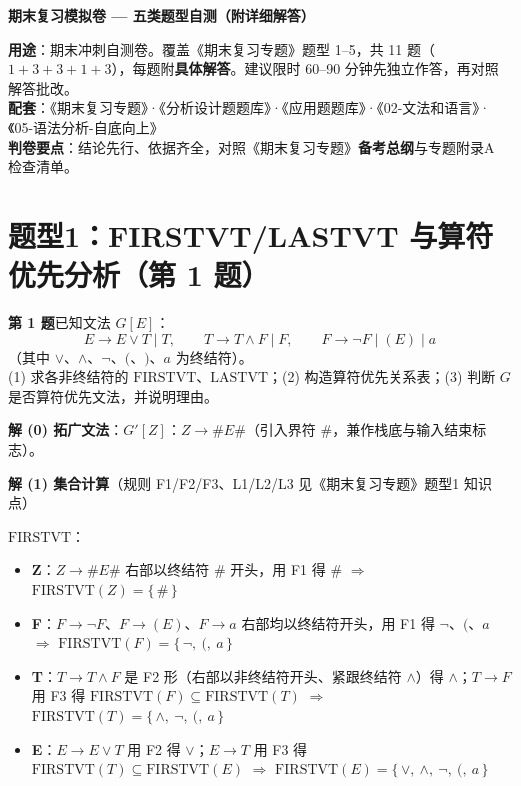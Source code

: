 \documentclass[12pt,a4paper,fontset=windows]{ctexart}
\newcommand{\FV}[1]{\ensuremath{\mathrm{FIRSTVT}(#1)}}
\newcommand{\FVname}{\ensuremath{\mathrm{FIRSTVT}}}
\newcommand{\LVname}{\ensuremath{\mathrm{LASTVT}}}
\newcommand{\imp}{\ensuremath{\Rightarrow}}
\begin{document}
\begin{center}
{\LARGE\bfseries 期末复习模拟卷 — 五类题型自测（附详细解答）}
\end{center}

\begin{infobox}
\textbf{用途}：期末冲刺自测卷。覆盖《期末复习专题》题型 1--5，共 11 题（$1+3+3+1+3$），每题附\textbf{具体解答}。建议限时 60--90 分钟先独立作答，再对照解答批改。\\
\textbf{配套}：《期末复习专题》·《分析设计题题库》·《应用题题库》·《02-文法和语言》·《05-语法分析-自底向上》\\
\textbf{判卷要点}：结论先行、依据齐全，对照《期末复习专题》\textbf{备考总纲}与专题附录A 检查清单。
\end{infobox}

\section{题型1：FIRSTVT/LASTVT 与算符优先分析（第 1 题）}

\begin{qbox}
{\large\bfseries 第 1 题}\quad 已知文法 $G[E]$：
\[ E \to E \vee T \mid T,\qquad T \to T \wedge F \mid F,\qquad F \to \neg F \mid (E) \mid a \]
（其中 $\vee$、$\wedge$、$\neg$、$($、$)$、$a$ 为终结符）。\\
(1) 求各非终结符的 \FVname、\LVname；(2) 构造算符优先关系表；(3) 判断 $G$ 是否算符优先文法，并说明理由。
\end{qbox}

\textbf{解 (0) 拓广文法}：$G'[Z]$：$Z \to \#E\#$（引入界符 $\#$，兼作栈底与输入结束标志）。

\textbf{解 (1) 集合计算}（规则 F1/F2/F3、L1/L2/L3 见《期末复习专题》题型1 知识点）

\FVname{}：
\begin{itemize}
\item \textbf{Z}：$Z \to \#E\#$ 右部以终结符 $\#$ 开头，用 F1 得 $\#$ \imp{} $\FV{Z} = \{\,\#\,\}$
\item \textbf{F}：$F \to \neg F$、$F \to (E)$、$F \to a$ 右部均以终结符开头，用 F1 得 $\neg$、$($、$a$ \imp{} $\FV{F} = \{\,\neg,\ (,\ a\,\}$
\item \textbf{T}：$T \to T \wedge F$ 是 F2 形（右部以非终结符开头、紧跟终结符 $\wedge$）得 $\wedge$；$T \to F$ 用 F3 得 $\FV{F} \subseteq \FV{T}$ \imp{} $\FV{T} = \{\,\wedge,\ \neg,\ (,\ a\,\}$
\item \textbf{E}：$E \to E \vee T$ 用 F2 得 $\vee$；$E \to T$ 用 F3 得 $\FV{T} \subseteq \FV{E}$ \imp{} $\FV{E} = \{\,\vee,\ \wedge,\ \neg,\ (,\ a\,\}$
\end{itemize}
\end{document}

